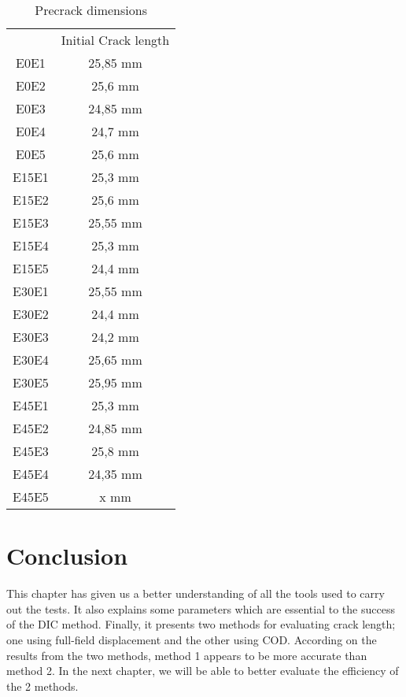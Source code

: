 \begin{table}[h]
	\centering
	\begin{tabular}{c c }
		\multicolumn{1}{l}{} & \multicolumn{1}{l}{Initial Crack length} \\
		\multicolumn{1}{c}{\cellcolor[HTML]{F8CBAD}E0E1} & 25,85   mm \\
		\multicolumn{1}{c}{\cellcolor[HTML]{F8CBAD}E0E2} & 25,6 mm \\
		\multicolumn{1}{c}{\cellcolor[HTML]{F8CBAD}E0E3} & 24,85 mm \\
		\multicolumn{1}{c}{\cellcolor[HTML]{F8CBAD}E0E4} & 24,7 mm \\ 
		\cellcolor[HTML]{F8CBAD}E0E5 & 25,6 mm \\ 
		\cellcolor[HTML]{C65911}E15E1 & 25,3 mm \\ 
		\multicolumn{1}{c}{\cellcolor[HTML]{C65911}E15E2} & 25,6 mm \\ 
		\multicolumn{1}{c}{\cellcolor[HTML]{C65911}E15E3} & 25,55 mm \\ 
		\multicolumn{1}{c}{\cellcolor[HTML]{C65911}E15E4} & 25,3 mm \\ 
		\multicolumn{1}{c}{\cellcolor[HTML]{C65911}E15E5} & 24,4 mm \\ 
		\multicolumn{1}{c}{\cellcolor[HTML]{BF8F00}E30E1} & 25,55 mm \\ 
		\multicolumn{1}{c}{\cellcolor[HTML]{BF8F00}E30E2} & 24,4 mm \\ 
		\multicolumn{1}{c}{\cellcolor[HTML]{BF8F00}E30E3} & 24,2 mm \\ 
		\multicolumn{1}{c}{\cellcolor[HTML]{BF8F00}E30E4} & 25,65 mm \\ 
		\multicolumn{1}{c}{\cellcolor[HTML]{BF8F00}E30E5} & 25,95 mm \\ 
		\multicolumn{1}{c}{\cellcolor[HTML]{FFA500}E45E1} & 25,3 mm \\ 
		\multicolumn{1}{c}{\cellcolor[HTML]{FFA500}E45E2} & 24,85 mm \\
		\multicolumn{1}{c}{\cellcolor[HTML]{FFA500}E45E3} & 25,8 mm \\ 
		\multicolumn{1}{c}{\cellcolor[HTML]{FFA500}E45E4} & 24,35 mm \\ 
		\multicolumn{1}{c}{\cellcolor[HTML]{FFA500}E45E5} & x mm \\ 
	\end{tabular}
	\caption{Precrack dimensions}
	\label{tab:Tab11}
\end{table}


\section{Conclusion}

This chapter has given us a better understanding of all the tools used to carry out the tests. It also explains some parameters which are essential to the success of the DIC method. Finally, it presents two methods for evaluating crack length; one using full-field displacement and the other using COD.
According on the results from the two methods, method 1 appears to be more accurate than method 2. In the next chapter, we will be able to better evaluate the efficiency of the 2 methods.


